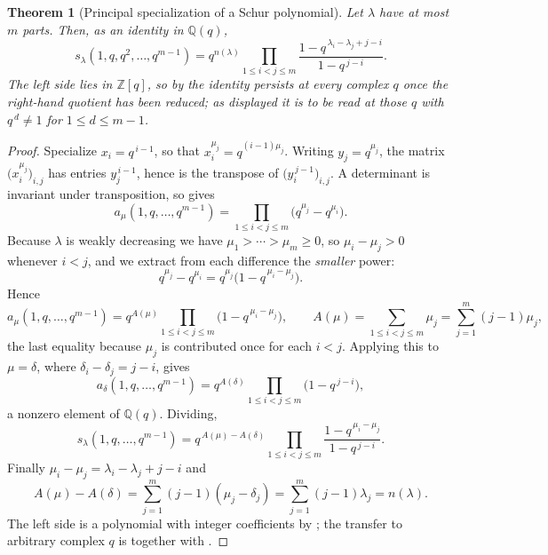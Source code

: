 \documentclass[11pt,oneside,openany]{book}
\newtheorem{theorem}{Theorem}[chapter]
\theoremstyle{definition}
\theoremstyle{remark}
\newcommand{\Q}{\mathbb Q}
\newcommand{\Z}{\mathbb Z}
\begin{document}
\begin{theorem}[Principal specialization of a Schur polynomial]\label{thm:schur-principal}
Let $\lambda$ have at most $m$ parts.  Then, as an identity in $\Q(q)$,
\[
 s_\lambda(1,q,q^2,\ldots,q^{m-1})
 =q^{n(\lambda)}
 \prod_{1\le i<j\le m}
 \frac{1-q^{\,\lambda_i-\lambda_j+j-i}}{1-q^{\,j-i}}.
\]
The left side lies in $\Z[q]$, so by  the
identity persists at every complex $q$ once the right-hand quotient has been
reduced; as displayed it is to be read at those $q$ with $q^{\,d}\ne1$ for
$1\le d\le m-1$.
\end{theorem}

\begin{proof}
Specialize $x_i=q^{\,i-1}$, so that $x_i^{\mu_j}=q^{(i-1)\mu_j}$.  Writing
$y_j=q^{\mu_j}$, the matrix $\bigl(x_i^{\mu_j}\bigr)_{i,j}$ has entries
$y_j^{\,i-1}$, hence is the transpose of $\bigl(y_i^{\,j-1}\bigr)_{i,j}$.
A determinant is invariant under transposition, so
 gives
\[
 a_\mu(1,q,\ldots,q^{m-1})
 =\prod_{1\le i<j\le m}\bigl(q^{\mu_j}-q^{\mu_i}\bigr).
\]
Because $\lambda$ is weakly decreasing we have $\mu_1>\cdots>\mu_m\ge0$, so
$\mu_i-\mu_j>0$ whenever $i<j$, and we extract from each difference the
\emph{smaller} power:
\[
 q^{\mu_j}-q^{\mu_i}=q^{\mu_j}\bigl(1-q^{\,\mu_i-\mu_j}\bigr).
\]
Hence
\[
 a_\mu(1,q,\ldots,q^{m-1})
 =q^{A(\mu)}\prod_{1\le i<j\le m}\bigl(1-q^{\,\mu_i-\mu_j}\bigr),
 \qquad
 A(\mu)=\sum_{1\le i<j\le m}\mu_j=\sum_{j=1}^{m}(j-1)\mu_j,
\]
the last equality because $\mu_j$ is contributed once for each $i<j$.
Applying this to $\mu=\delta$, where $\delta_i-\delta_j=j-i$, gives
\[
 a_\delta(1,q,\ldots,q^{m-1})
 =q^{A(\delta)}\prod_{1\le i<j\le m}\bigl(1-q^{\,j-i}\bigr),
\]
a nonzero element of $\Q(q)$.  Dividing,
\[
 s_\lambda(1,q,\ldots,q^{m-1})
 =q^{\,A(\mu)-A(\delta)}
 \prod_{1\le i<j\le m}
 \frac{1-q^{\,\mu_i-\mu_j}}{1-q^{\,j-i}}.
\]
Finally $\mu_i-\mu_j=\lambda_i-\lambda_j+j-i$ and
\[
 A(\mu)-A(\delta)=\sum_{j=1}^{m}(j-1)(\mu_j-\delta_j)
 =\sum_{j=1}^{m}(j-1)\lambda_j=n(\lambda).
\]
The left side is a polynomial with integer coefficients by
; the transfer to arbitrary complex $q$ is
 together with
.
\end{proof}
\end{document}
